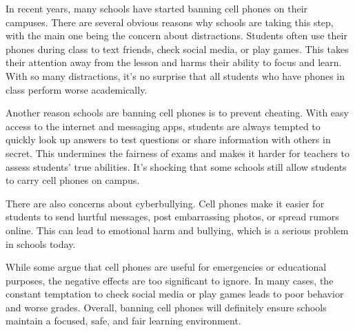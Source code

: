 \documentclass[12pt]{article}
\begin{document}
\vspace{2em}
\begin{tcolorbox}[colframe=black!60, colback=white, 
coltitle=black, colbacktitle=black!15, fonttitle=\bfseries\Large, 
title=Text: School Cell Phone Policies, halign title=center, left=10pt, right=10pt, top=10pt, bottom=15pt]
In recent years, many schools have started banning cell phones on their campuses. There are several obvious reasons why schools are taking this step, with the main one being the concern about distractions. Students often use their phones during class to text friends, check social media, or play games. This takes their attention away from the lesson and harms their ability to focus and learn. With so many distractions, it's no surprise that all students who have phones in class perform worse academically.

Another reason schools are banning cell phones is to prevent cheating. With easy access to the internet and messaging apps, students are always tempted to quickly look up answers to test questions or share information with others in secret. This undermines the fairness of exams and makes it harder for teachers to assess students' true abilities. It's shocking that some schools still allow students to carry cell phones on campus.

There are also concerns about cyberbullying. Cell phones make it easier for students to send hurtful messages, post embarrassing photos, or spread rumors online. This can lead to emotional harm and bullying, which is a serious problem in schools today.

While some argue that cell phones are useful for emergencies or educational purposes, the negative effects are too significant to ignore. In many cases, the constant temptation to check social media or play games leads to poor behavior and worse grades. Overall, banning cell phones will definitely ensure schools maintain a focused, safe, and fair learning environment.

 

 
\end{tcolorbox}
\vspace{2em}
\end{document}
